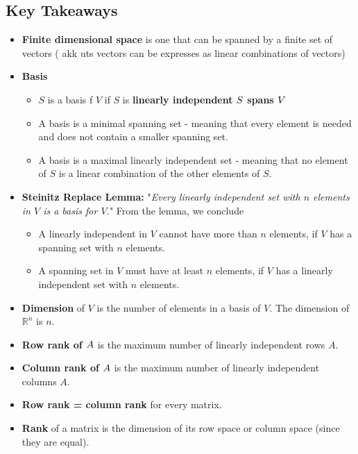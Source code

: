 \documentclass[a4paper, 9pt]{extarticle}
\begin{document}
\subsection{Key Takeaways}
\begin{takeaway-box}{}{}
\begin{itemize}
  \item \textbf{Finite dimensional space} is one that can be spanned by a finite set of vectors ( akk uts vectors can be expresses as linear combinations of vectors)
  \item \textbf{Basis}
        \begin{itemize}
          \item $S$ is a basis f $V$ if $S$ is \textbf{linearly independent}  \textbf{$\boldmath{S}$ spans $\boldmath{V}$}
          \item A basis is a minimal spanning set - meaning that every element is needed and does not contain a smaller spanning set.
          \item A basis is a maximal linearly independent set - meaning that no element of $S$ is a linear combination of the other elements of $S$.
        \end{itemize}
  \item \textbf{Steinitz Replace Lemma:} "\textit{Every linearly independent set with $n$ elements in $V$ is a basis for $V$.}" From the lemma, we conclude
        \begin{itemize}
          \item A linearly independent in $V$ cannot have more than $n$ elements, if $V$ has a spanning set with $n$ elements.
          \item A spanning set in $V$ must have at least $n$ elements, if $V$ has a linearly independent set with $n$ elements.
        \end{itemize}
  \item \textbf{Dimension} of $V$ is the number of elements in a basis of $V$. The dimension of $\mathbb{R}^n$ is $n$.
  \item \textbf{Row rank of $\boldmath{A}$} is the maximum number of linearly independent rows $A$.
  \item \textbf{Column rank of $\boldmath{A}$} is the maximum number of linearly independent columns $A$.
  \item \textbf{Row rank = column rank} for every matrix.
  \item \textbf{Rank} of a matrix is the dimension of its row space or column space (since they are equal).

\end{itemize}
\end{takeaway-box}
\end{document}
